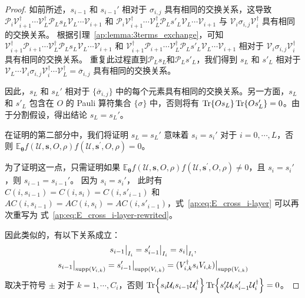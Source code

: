 \begin{lemma}
\begin{proof}
    如前所述，$s_{i-1}$ 和 $s_{i-1}'$ 相对于 $\sigma_{i,j}$ 具有相同的交换关系，这导致 $\mathcal{P}_{i} \mathcal{V}_{i+1}^\dagger \cdots \mathcal{V}_L^\dagger \mathcal{P}_L s_L \mathcal{V}_L \cdots\mathcal{V}_{i+1}$ 和 $\mathcal{P}_{i}\mathcal{V}_{i+1}^\dagger \cdots \mathcal{V}_L^\dagger \mathcal{P}_L s'_L \mathcal{V}_L\cdots \mathcal{V}_{i+1}$ 与 $\mathcal{V}_{i} \sigma_{i,j}\mathcal{V}_{i}^\dagger$ 具有相同的交换关系。
    根据引理~\ref{ap:lemma:3terms_exchange}，可知$\mathcal{V}_{i+1}^\dagger \mathcal{P}_{i+1}\cdots \mathcal{V}_L^\dagger \mathcal{P}_L s_L \mathcal{V}_L\cdots\mathcal{V}_{i+1}$ 和 $\mathcal{V}_{i+1}^\dagger \mathcal{P}_{i+1}\cdots \mathcal{V}_L^\dagger \mathcal{P}_L s'_L \mathcal{V}_L\cdots\mathcal{V}_{i+1}$ 相对于 $\mathcal{V}_{i}\sigma_{i,j}\mathcal{V}_{i}^\dagger$ 具有相同的交换关系。
    重复此过程直到$\mathcal{P}_L s_L$和$\mathcal{P}_L s'_L$，我们得到 $s_L$ 和 $s'_L$ 相对于 $\mathcal{V}_{L} \cdots \mathcal{V}_{i} \sigma_{i,j} \mathcal{V}_{i}^\dagger\cdots \mathcal{V}_{L}^\dagger=\overline{\sigma}_{i,j}$ 具有相同的交换关系。

    因此，$s_L$ 和 $s_L'$ 相对于 $\{\overline{\sigma}_{i,j}\}$ 中的每个元素具有相同的交换关系。另一方面，$s_L$ 和 $s'_L$ 包含在 $O$ 的 Pauli 算符集合 $\{\sigma\}$ 中，否则将有 $\Tr{Os_L}\Tr{Os'_L}=0$。由于分割假设，得出结论 $s_L=s_L'$。


    在证明的第二部分中，我们将证明 $s_L=s_L'$ 意味着 $s_i=s_i'$ 对于 $i=0,\cdots,L$，否则 $\mathbb{E}_{\bm{\theta}}f(\mathcal{U},\bm{s},O,\rho)f(\mathcal{U},\bm{s^{\prime}},O,\rho)=0$。
    
    为了证明这一点，只需证明如果 $\mathbb{E}_{\bm{\theta}}f(\mathcal{U},\bm{s},O,\rho)f(\mathcal{U},\bm{s^{\prime}},O,\rho)\neq 0$，且 $s_i=s_i'$，则 $s_{i-1}=s_{i-1}'$。
    因为 $s_{i}=s_{i}'$， 此时有 $C(i,s_{i-1})=C(i,s_{i})=C(i,s'_{i-1})$ 和 $AC(i,s_{i-1})=AC(i,s_{i})=AC(i,s'_{i-1})$，式~\eqref{ap:eq:E_cross_i-layer} 可以再次重写为 式~\eqref{ap:eq:E_cross_i-layer-rewrited}。
    
    因此类似的，有以下关系成立：
    \begin{equation}
    \begin{gathered}
      s_{i-1}\big|_{I_i}=s'_{i-1}\big|_{I_i}=s_i\big|_{I_i},\\
      s_{i-1}\big|_{{\text{supp} \left( V_{i,k} \right)}}=s'_{i-1}\big|_{{\text{supp} \left( V_{i,k} \right)}}=(V_{i,k}^\dagger s_i V_{i,k}) \big|_{{\text{supp} \left( V_{i,k} \right)}}
    \end{gathered}
    \end{equation}
    取决于符号 $\pm$ 对于 $k=1,\cdots,C_i$，否则 $\Tr{s_i\mathcal{U}_i s_{i-1}\mathcal{U}_i^\dagger}\Tr{s'_i\mathcal{U}_i s'_{i-1}\mathcal{U}_i^\dagger}=0$。
    

\end{proof}
\end{lemma}
